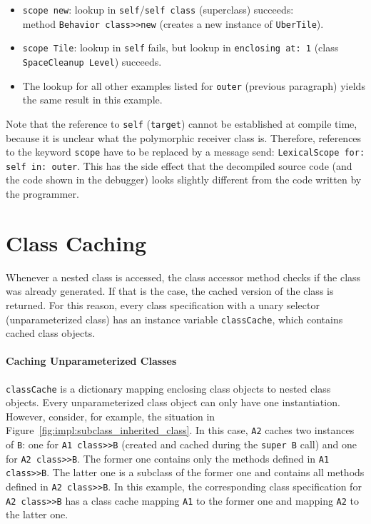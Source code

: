 \begin{itemize}
	\item \texttt{scope new}: lookup in \texttt{self}/\texttt{self class} (superclass) succeeds: \\ method \texttt{Behavior class>>new} (creates a new instance of \texttt{UberTile}).
	\item \texttt{scope Tile}: lookup in \texttt{self} fails, but lookup in \texttt{enclosing at: 1} (class \texttt{SpaceCleanup Level}) succeeds.
	\item The lookup for all other examples listed for \texttt{outer} (previous paragraph) yields the same result in this example.
\end{itemize}

Note that the reference to \texttt{self} (\texttt{target}) cannot be established at compile time, because it is unclear what the polymorphic receiver class is. Therefore, references to the keyword \texttt{scope} have to be replaced by a message send: \texttt{LexicalScope for: self in: outer}. This has the side effect that the decompiled source code (and the code shown in the debugger) looks slightly different from the code written by the programmer.

\section{Class Caching}
\label{sec:impl_class_cache}
Whenever a nested class is accessed, the class accessor method checks if the class was already generated. If that is the case, the cached version of the class is returned. For this reason, every class specification with a unary selector (unparameterized class) has an instance variable \texttt{classCache}, which contains cached class objects. 

\paragraph{Caching Unparameterized Classes}
\texttt{classCache} is a dictionary mapping enclosing class objects to nested class objects. Every unparameterized class object can only have one instantiation. However, consider, for example, the situation in Figure~\ref{fig:impl:subclass_inherited_class}. In this case, \texttt{A2} caches two instances of \texttt{B}: one for \texttt{A1 class>>B} (created and cached during the \texttt{super B} call) and one for \texttt{A2 class>>B}. The former one contains only the methods defined in \texttt{A1 class>>B}. The latter one is a subclass of the former one and contains all methods defined in \texttt{A2 class>>B}. In this example, the corresponding class specification for \texttt{A2 class>>B} has a class cache mapping \texttt{A1} to the former one and mapping \texttt{A2} to the latter one.

